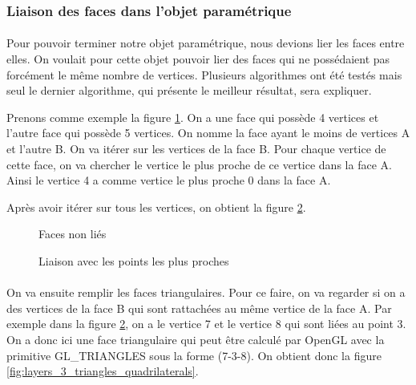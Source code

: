 \documentclass[article, backcover, french, nodocumentinfo]{upmethodology-document}
\begin{document}
	\subsubsection{Liaison des faces dans l'objet paramétrique}
		\paragraph{} Pour pouvoir terminer notre objet paramétrique, nous devions lier les faces entre elles. On voulait pour cette objet pouvoir lier des faces qui ne possédaient pas forcément le même nombre de vertices. Plusieurs algorithmes ont été testés mais seul le dernier algorithme, qui présente le meilleur résultat, sera expliquer.
		
		Prenons comme exemple la figure \ref{fig:layers_1_empty}. On a une face qui possède 4 vertices et l'autre face qui possède 5 vertices. On nomme la face ayant le moins de vertices A et l'autre B. On va itérer sur les vertices de la face B. Pour chaque vertice de cette face, on va chercher le vertice le plus proche de ce vertice dans la face A. Ainsi le vertice 4 a comme vertice le plus proche 0 dans la face A.
		
		Après avoir itérer sur tous les vertices, on obtient la figure \ref{fig:layers_2_nearest_lines}.
		
		\par\noindent\begin{minipage}[t]{\textwidth}
			\centering
			\begin{minipage}[t]{0.49\textwidth}
				\begin{figure}[H]
					\centering%
					\caption{Faces non liés}%
					\label{fig:layers_1_empty}%
				\end{figure}
			\end{minipage}
			\begin{minipage}[t]{0.49\textwidth}
				\begin{figure}[H]
					\centering%
					\caption{Liaison avec les points les plus proches}%
					\label{fig:layers_2_nearest_lines}%
				\end{figure}
			\end{minipage}
		\end{minipage}
		\paragraph{} On va ensuite remplir les faces triangulaires. Pour ce faire, on va regarder si on a des vertices de la face B qui sont rattachées au même vertice de la face A. Par exemple dans la figure \ref{fig:layers_2_nearest_lines}, on a le vertice 7 et le vertice 8 qui sont liées au point 3. On a donc ici une face triangulaire qui peut être calculé par OpenGL avec la primitive GL\_TRIANGLES sous la forme (7-3-8). On obtient donc la figure \ref{fig:layers_3_triangles_quadrilaterals}.
		
\end{document}
